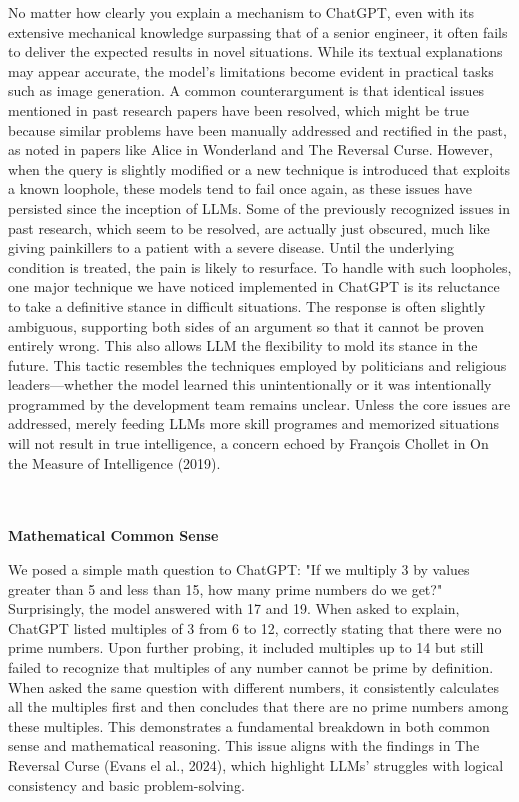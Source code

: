 \documentclass[11pt]{scrartcl}
\begin{document}
No matter how clearly you explain a mechanism to ChatGPT, even with its extensive mechanical knowledge surpassing that of a senior engineer, it often fails to deliver the expected results in novel situations. While its textual explanations may appear accurate, the model's limitations become evident in practical tasks such as image generation. A common counterargument is that identical issues mentioned in past research papers have been resolved, which might be true because similar problems have been manually addressed and rectified in the past, as noted in papers like Alice in Wonderland\cite{ref2} and The Reversal Curse\cite{ref1}. However, when the query is slightly modified or a new technique is introduced that exploits a known loophole, these models tend to fail once again, as these issues have persisted since the inception of LLMs. Some of the previously recognized issues in past research, which seem to be resolved, are actually just obscured, much like giving painkillers to a patient with a severe disease. Until the underlying condition is treated, the pain is likely to resurface. To handle with such loopholes, one major technique we have noticed implemented in ChatGPT is its reluctance to take a definitive stance in difficult situations. The response is often slightly ambiguous, supporting both sides of an argument so that it cannot be proven entirely wrong. This also allows LLM the flexibility to mold its stance in the future. This tactic resembles the techniques employed by politicians and religious leaders—whether the model learned this unintentionally or it was intentionally programmed by the development team remains unclear. Unless the core issues are addressed, merely feeding LLMs more skill programes and memorized situations will not result in true intelligence, a concern echoed by François Chollet in On the Measure of Intelligence (2019)\cite{ref3}. \\ \\ \\ 

\begin{huge}
\textbf{Mathematical Common Sense}
\end{huge}
We posed a simple math question to ChatGPT: "If we multiply 3 by values greater than 5 and less than 15, how many prime numbers do we get?" Surprisingly, the model answered with 17 and 19. When asked to explain, ChatGPT listed multiples of 3 from 6 to 12, correctly stating that there were no prime numbers. Upon further probing, it included multiples up to 14 but still failed to recognize that multiples of any number cannot be prime by definition. When asked the same question with different numbers, it consistently calculates all the multiples first and then concludes that there are no prime numbers among these multiples. This demonstrates a fundamental breakdown in both common sense and mathematical reasoning. This issue aligns with the findings in The Reversal Curse (Evans el al., 2024)\cite{ref1}, which highlight LLMs' struggles with logical consistency and basic problem-solving.
\end{document}
